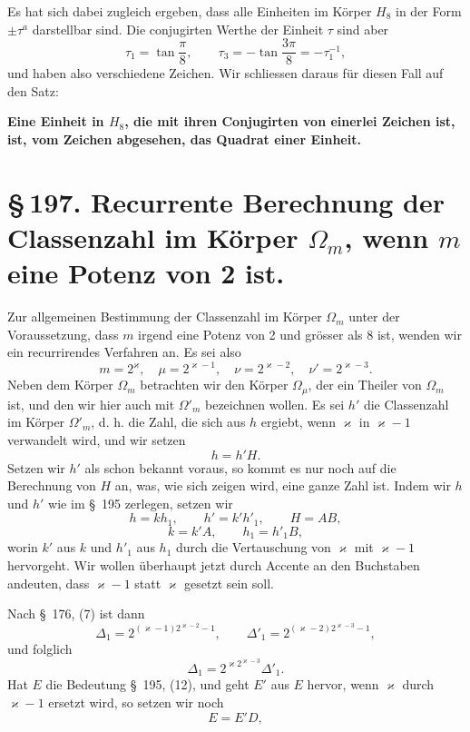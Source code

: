 \documentclass[11pt]{article}
\begin{document}
Es hat sich dabei zugleich ergeben, dass alle Einheiten im Körper $H_8$ in der Form $\pm\tau^a$ darstellbar sind. Die conjugirten Werthe der Einheit $\tau$ sind aber
\[
\tau_1=\tan\frac\pi8,
\qquad
\tau_3=-\tan\frac{3\pi}{8}=-\tau_1^{-1},
\]
und haben also verschiedene Zeichen. Wir schliessen daraus für diesen Fall auf den Satz:
\begin{center}
\textbf{Eine Einheit in $H_8$, die mit ihren Conjugirten von einerlei Zeichen ist, ist, vom Zeichen abgesehen, das Quadrat einer Einheit.}
\end{center}

\section*{\S\,197. Recurrente Berechnung der Classenzahl im Körper $\Omega_m$, wenn $m$ eine Potenz von 2 ist.}

Zur allgemeinen Bestimmung der Classenzahl im Körper $\Omega_m$ unter der Voraussetzung, dass $m$ irgend eine Potenz von 2 und grösser als 8 ist, wenden wir ein recurrirendes Verfahren an. Es sei also
\begin{equation}
m=2^\varkappa,
\quad \mu=2^{\varkappa-1},
\quad \nu=2^{\varkappa-2},
\quad \nu'=2^{\varkappa-3}.
\tag{1}
\end{equation}
Neben dem Körper $\Omega_m$ betrachten wir den Körper $\Omega_\mu$, der ein Theiler von $\Omega_m$ ist, und den wir hier auch mit $\Omega'_m$ bezeichnen wollen. Es sei $h'$ die Classenzahl im Körper $\Omega'_m$, d. h. die Zahl, die sich aus $h$ ergiebt, wenn $\varkappa$ in $\varkappa-1$ verwandelt wird, und wir setzen
\begin{equation}
h=h'H.
\tag{2}
\end{equation}
Setzen wir $h'$ als schon bekannt voraus, so kommt es nur noch auf die Berechnung von $H$ an, was, wie sich zeigen wird, eine ganze Zahl ist. Indem wir $h$ und $h'$ wie im \S~195 zerlegen, setzen wir
\begin{equation}
h=kh_1,
\qquad
h'=k'h'_1,
\qquad
H=AB,
\tag{3}
\end{equation}
\begin{equation}
k=k'A,
\qquad
h_1=h'_1B,
\tag{4}
\end{equation}
worin $k'$ aus $k$ und $h'_1$ aus $h_1$ durch die Vertauschung von $\varkappa$ mit $\varkappa-1$ hervorgeht. Wir wollen überhaupt jetzt durch Accente an den Buchstaben andeuten, dass $\varkappa-1$ statt $\varkappa$ gesetzt sein soll.

Nach \S~176, (7) ist dann
\[
\Delta_1=2^{(\varkappa-1)2^{\varkappa-2}-1},
\qquad
\Delta'_1=2^{(\varkappa-2)2^{\varkappa-3}-1},
\]
und folglich
\begin{equation}
\Delta_1=2^{\varkappa2^{\varkappa-3}}\Delta'_1.
\tag{5}
\end{equation}
Hat $E$ die Bedeutung \S~195, (12), und geht $E'$ aus $E$ hervor, wenn $\varkappa$ durch $\varkappa-1$ ersetzt wird, so setzen wir noch
\begin{equation}
E=E'D,
\tag{6}
\end{equation}
\end{document}
